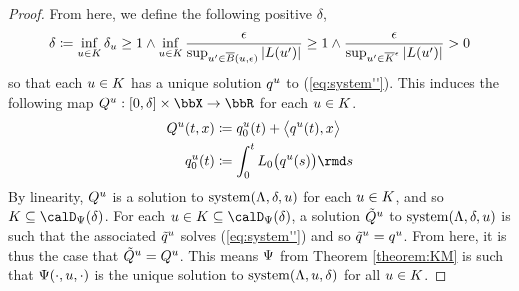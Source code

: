 \begin{proof}
  From here, we define the following positive $\delta$,
  \begin{equation*}
    \delta \coloneqq \inf_{u \in K} \delta_u \geq 1 \wedge \inf_{u\in K} \frac{\epsilon}{\sup_{u' \in \overline B(u,\epsilon)} |L(u')|} \geq 1 \wedge \frac{\epsilon}{\sup_{u' \in \overline K^\epsilon} |L(u')|} > 0
  \end{equation*}
  so that each $u \in K$ has a unique solution $q^u$ to (\ref{eq:system''}).
  This induces the following map $Q^\momentVar: [0,\delta] \times \stateSpace \rightarrow \bbR$ for each $u \in K$.
  \begin{align*}
    Q^\momentVar(t,\stateVar) &\defeq q^\momentVar_0(t) + \bprj{q^\momentVar(t)}{\stateVar} \\
    q_0^\momentVar(t) &\defeq \int_0^t \odePart_0\big(q^\momentVar(s)\big) \rmd s
  \end{align*}
  By linearity, $Q^u$ is a solution to $\operatorname{system}(\Lambda, \delta, u)$ for each $u \in K$, and so $K \subseteq \momentSpace(\delta)$.
  For each $\momentVar \in K \subseteq \momentSpace(\delta)$, a solution $\tilde Q^u$ to $\operatorname{system}(\Lambda,\delta,u)$ is such that the associated $\tilde q^u$ solves (\ref{eq:system''}) and so $\tilde q^u = q^u$.
  From here, it is thus the case that $\tilde Q^u = Q^u$.
  This means $\Psi$ from Theorem \ref{theorem:KM} is such that $\Psi(\cdot,u,\cdot)$ is the unique solution to $\operatorname{system}(\Lambda,u,\delta)$ for all $u \in K$.
\end{proof}
